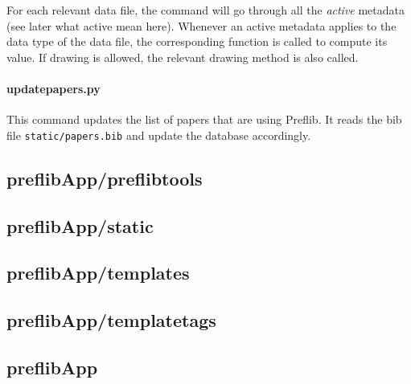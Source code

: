 \documentclass{report}
\begin{document}
	For each relevant data file, the command will go through all the \emph{active} metadata (see later what active mean here). Whenever an active metadata applies to the data type of the data file, the corresponding function is called to compute its value. If drawing is allowed, the relevant drawing method is also called.
	
	\paragraph*{\faFileO{} updatepapers.py} This command updates the list of papers that are using Preflib. It reads the bib file \texttt{static/papers.bib} and update the database accordingly.
	
	\subsection*{\faFolderO{} preflibApp/preflibtools}
	
	\subsection*{\faFolderO{} preflibApp/static}
	
	\subsection*{\faFolderO{} preflibApp/templates}
	
	\subsection*{\faFolderO{} preflibApp/templatetags}
	
	\subsection*{\faFolderO{} preflibApp}
		
\end{document}
